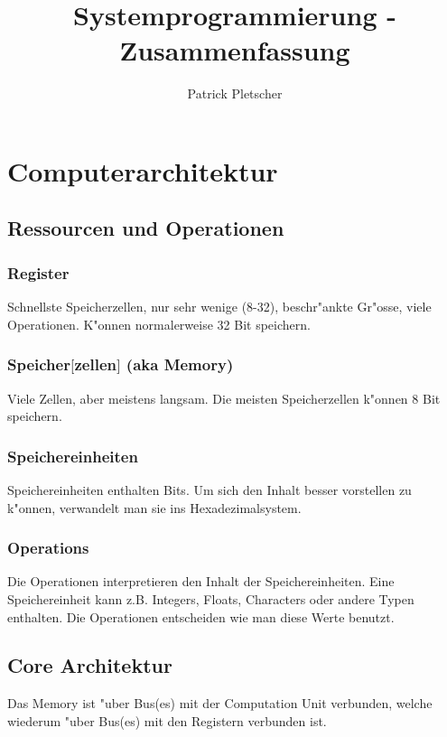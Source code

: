 \documentclass[german, 10pt, a4paper, twocolumn]{scrartcl}
\title{Systemprogrammierung - Zusammenfassung}
\author{Patrick Pletscher}
\begin{document}
\maketitle

\section{Computerarchitektur}

\subsection{Ressourcen und Operationen}

\subsubsection{Register}

Schnellste Speicherzellen, nur sehr wenige (8-32), beschr"ankte Gr"osse, viele Operationen. K"onnen normalerweise 32 Bit speichern.

\subsubsection{Speicher$[$zellen$]$ (aka Memory)}

Viele Zellen, aber meistens langsam. Die meisten Speicherzellen k"onnen 8 Bit speichern.

\subsubsection{Speichereinheiten}

Speichereinheiten enthalten Bits. Um sich den Inhalt besser vorstellen zu k"onnen, verwandelt man sie ins Hexadezimalsystem.

\subsubsection{Operations}

Die Operationen interpretieren den Inhalt der Speichereinheiten. Eine Speichereinheit kann z.B. Integers, Floats, Characters oder andere Typen enthalten. Die Operationen entscheiden wie man diese Werte benutzt.

\subsection{Core Architektur}

Das Memory ist "uber Bus(es) mit der Computation Unit verbunden, welche wiederum "uber Bus(es) mit den Registern verbunden ist.
\end{document}

